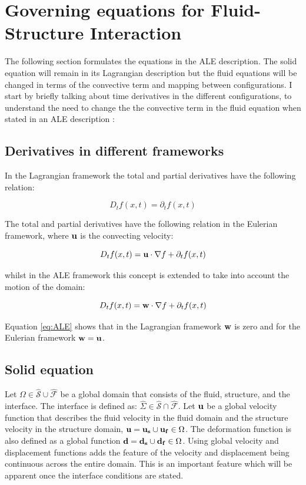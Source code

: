 \section{Governing equations for Fluid-Structure Interaction}


The following section formulates the equations in the ALE description. The solid equation will remain in its Lagrangian description but the fluid equations will be changed in terms of the convective term and mapping between configurations. I start by briefly talking about time derivatives in the different configurations, to understand the need to change the the convective term in the fluid equation when stated in an ALE description \cite{Wick2011}:

\subsection{Derivatives in different frameworks}

In the Lagrangian framework the total and partial derivatives have the following relation:

\begin{equation}
D_t f(x,t) = \partial_t f(x,t) 
\end{equation}

The total and partial derivatives have the following relation in the Eulerian framework, where $\bold{u}$ is the convecting velocity:

\begin{equation}
D_t f(x,t) = \bold{u}\cdot \nabla{f} + \partial_t f(x,t)
\end{equation}

whilst in the ALE framework this concept is extended to take into account the motion of the domain:

\begin{equation}\label{eq:ALE}
D_t f(x,t) = \bold{w} \cdot\nabla{f} + \partial_t f(x,t)
\end{equation}

Equation \ref{eq:ALE} shows that in the Lagrangian framework $ \bold{w}$ is zero and for the Eulerian framework $\bold{w} = \bold{u}$.

\subsection{Solid equation}
Let $\Omega \in \hat{\mathcal{S}} \cup \hat{\mathcal{F}} $ be a global domain that consists of the fluid, structure, and the interface. The interface is defined as: $ \hat{\Sigma} \in \hat{\mathcal{S}} \cap \hat{\mathcal{F}}  $. Let $\bold{u}$ be a global velocity function that describes the fluid velocity in the fluid domain and the structure velocity in the structure domain, $\bold{u} = \bold{u_s} \cup \bold{u_f} \in \Omega$. The deformation function is also defined as a global function $\bold{d} = \bold{d_s} \cup \bold{d_f} \in \Omega$. Using global velocity and displacement functions adds the feature of the velocity and displacement being continuous across the entire domain. This is an important feature which will be apparent once the interface conditions are stated. \newline 

